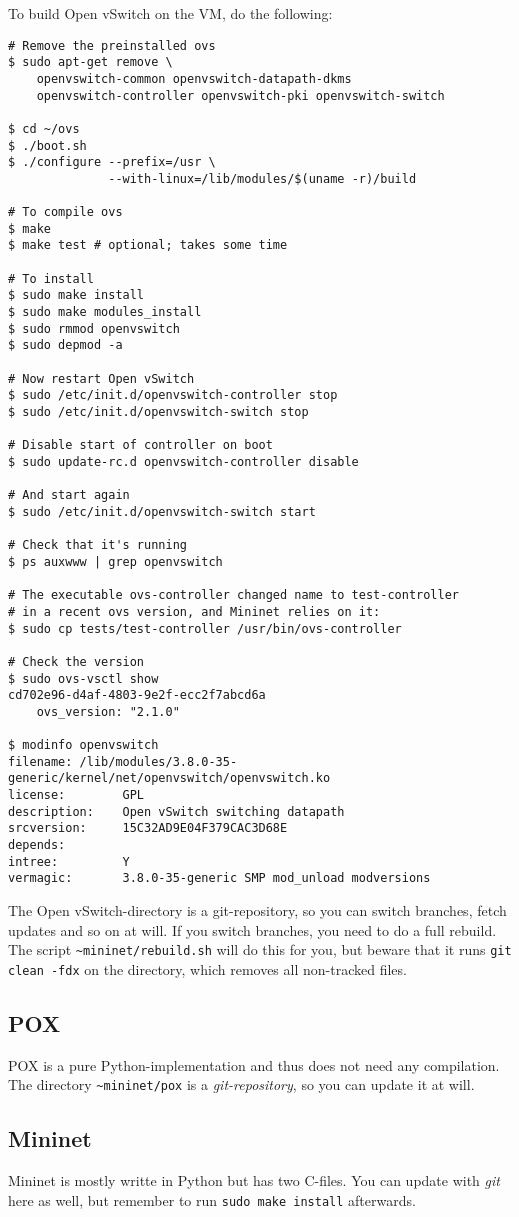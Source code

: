 To build Open vSwitch on the VM, do the following:

\begin{Verbatim}
# Remove the preinstalled ovs
$ sudo apt-get remove \
    openvswitch-common openvswitch-datapath-dkms
    openvswitch-controller openvswitch-pki openvswitch-switch

$ cd ~/ovs
$ ./boot.sh
$ ./configure --prefix=/usr \
              --with-linux=/lib/modules/$(uname -r)/build

# To compile ovs
$ make
$ make test # optional; takes some time

# To install
$ sudo make install
$ sudo make modules_install
$ sudo rmmod openvswitch
$ sudo depmod -a

# Now restart Open vSwitch
$ sudo /etc/init.d/openvswitch-controller stop
$ sudo /etc/init.d/openvswitch-switch stop

# Disable start of controller on boot
$ sudo update-rc.d openvswitch-controller disable

# And start again
$ sudo /etc/init.d/openvswitch-switch start

# Check that it's running
$ ps auxwww | grep openvswitch

# The executable ovs-controller changed name to test-controller
# in a recent ovs version, and Mininet relies on it:
$ sudo cp tests/test-controller /usr/bin/ovs-controller

# Check the version
$ sudo ovs-vsctl show
cd702e96-d4af-4803-9e2f-ecc2f7abcd6a
    ovs_version: "2.1.0"

$ modinfo openvswitch
filename: /lib/modules/3.8.0-35-generic/kernel/net/openvswitch/openvswitch.ko
license:        GPL
description:    Open vSwitch switching datapath
srcversion:     15C32AD9E04F379CAC3D68E
depends:
intree:         Y
vermagic:       3.8.0-35-generic SMP mod_unload modversions
\end{Verbatim}

The Open vSwitch-directory is a git-repository, so you can switch branches,
fetch updates and so on at will. If you switch
branches, you need to do a full rebuild. The script
\texttt{\~{}mininet/rebuild.sh} will do this for you, but beware that it
runs \texttt{git clean -fdx} on the directory, which removes all non-tracked
files\index{git!clean}.

\subsection{POX}

POX is a pure Python-implementation and thus does not need any
compilation.  The directory \texttt{\~{}mininet/pox} is a
\textit{git-repository}\index{git!POX}, so you can update it at will.

\subsection{Mininet}

Mininet is mostly writte in Python but has two C-files. You can update with
\textit{git} here as well, but remember to run \texttt{sudo make install}
afterwards\index{git!Mininet}.
